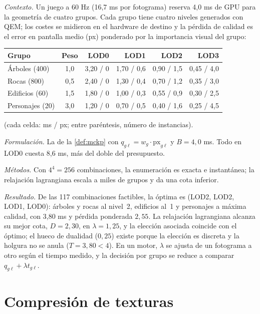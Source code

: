 \begin{ejemplo}\label{ej:lod}
\emph{Contexto.} Un juego a 60 Hz (16,7 ms por fotograma) reserva 4,0 ms de GPU para la geometría de cuatro grupos. Cada grupo tiene cuatro niveles generados con QEM; los costes se midieron en el hardware de destino y la pérdida de calidad es el error en pantalla medio (px) ponderado por la importancia visual del grupo:

\begin{center}\small
\begin{tabular}{@{}lcrrrr@{}}
\toprule
Grupo & Peso & LOD0 & LOD1 & LOD2 & LOD3 \\
\midrule
Árboles (400) & 1,0 & 3,20 / 0 & 1,70 / 0,6 & 0,90 / 1,5 & 0,45 / 4,0 \\
Rocas (800) & 0,5 & 2,40 / 0 & 1,30 / 0,4 & 0,70 / 1,2 & 0,35 / 3,0 \\
Edificios (60) & 1,5 & 1,80 / 0 & 1,00 / 0,3 & 0,55 / 0,9 & 0,30 / 2,5 \\
Personajes (20) & 3,0 & 1,20 / 0 & 0,70 / 0,5 & 0,40 / 1,6 & 0,25 / 4,5 \\
\bottomrule
\end{tabular}
\end{center}
(cada celda: ms / px; entre paréntesis, número de instancias).

\emph{Formulación.} La de la \cref{def:mckp} con $q_{g\ell}=w_g\cdot\text{px}_{g\ell}$ y $B=4{,}0$ ms. Todo en LOD0 cuesta 8,6 ms, más del doble del presupuesto.

\emph{Métodos.} Con $4^4=256$ combinaciones, la enumeración es exacta e instantánea; la relajación lagrangiana escala a miles de grupos y da una cota inferior.

\emph{Resultado.} De las 117 combinaciones factibles, la óptima es (LOD2, LOD2, LOD1, LOD0): árboles y rocas al nivel~2, edificios al~1 y personajes a máxima calidad, con 3,80 ms y pérdida ponderada $2{,}55$. La relajación lagrangiana alcanza su mejor cota, $D=2{,}30$, en $\lambda=1{,}25$, y la elección asociada coincide con el óptimo; el hueco de dualidad ($0{,}25$) existe porque la elección es discreta y la holgura no se anula ($T=3{,}80<4$). En un motor, $\lambda$ se ajusta de un fotograma a otro según el tiempo medido, y la decisión por grupo se reduce a comparar $q_{g\ell}+\lambda t_{g\ell}$.
\end{ejemplo}

\section{Compresión de texturas}


